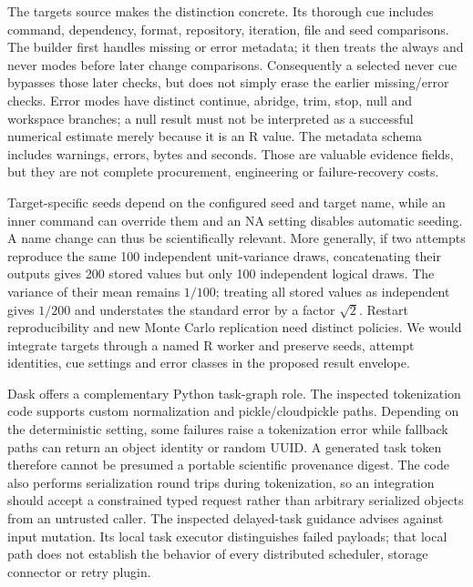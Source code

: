 The targets source makes the distinction concrete. Its thorough cue includes command, dependency, format, repository, iteration, file and seed comparisons. The builder first handles missing or error metadata; it then treats the always and never modes before later change comparisons. Consequently a selected never cue bypasses those later checks, but does not simply erase the earlier missing/error checks. Error modes have distinct continue, abridge, trim, stop, null and workspace branches; a null result must not be interpreted as a successful numerical estimate merely because it is an R value. The metadata schema includes warnings, errors, bytes and seconds. Those are valuable evidence fields, but they are not complete procurement, engineering or failure-recovery costs.\citep{exec25_dww_targets}

Target-specific seeds depend on the configured seed and target name, while an inner command can override them and an NA setting disables automatic seeding. A name change can thus be scientifically relevant. More generally, if two attempts reproduce the same 100 independent unit-variance draws, concatenating their outputs gives 200 stored values but only 100 independent logical draws. The variance of their mean remains $1/100$; treating all stored values as independent gives $1/200$ and understates the standard error by a factor $\sqrt{2}$. Restart reproducibility and new Monte Carlo replication need distinct policies. We would integrate targets through a named R worker and preserve seeds, attempt identities, cue settings and error classes in the proposed result envelope.\citep{exec25_dww_targets,exec25_dww_choice}

Dask offers a complementary Python task-graph role. The inspected tokenization code supports custom normalization and pickle/cloudpickle paths. Depending on the deterministic setting, some failures raise a tokenization error while fallback paths can return an object identity or random UUID. A generated task token therefore cannot be presumed a portable scientific provenance digest. The code also performs serialization round trips during tokenization, so an integration should accept a constrained typed request rather than arbitrary serialized objects from an untrusted caller. The inspected delayed-task guidance advises against input mutation. Its local task executor distinguishes failed payloads; that local path does not establish the behavior of every distributed scheduler, storage connector or retry plugin.\citep{exec25_dww_dask}


